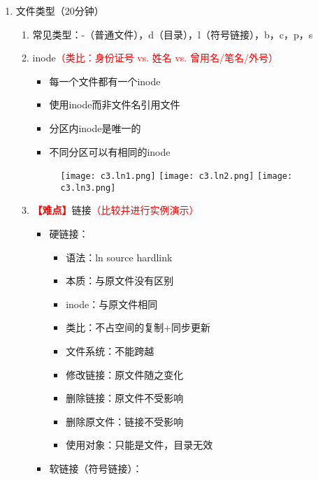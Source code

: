 \documentclass{TIJMUjiaoanLL}
\begin{document}
\begin{enumerate}
  \item 文件类型（20分钟）
    \begin{enumerate}
      \item 常见类型：-（普通文件），d（目录），l（符号链接），b，c，p，s
      \item inode\textcolor{red}{（类比：身份证号 vs. 姓名 vs. 曾用名/笔名/外号）}
        \vspace*{-10pt}
        \begin{multicols}{2}
          \begin{itemize}
	    \item 每一个文件都有一个inode
	    \item 使用inode而非文件名引用文件
	    \item 分区内inode是唯一的
	    \item 不同分区可以有相同的inode
	  \end{itemize}
        \end{multicols}
        \vspace*{-20pt}
        \begin{figure}[h]
	  \centering
	  \texttt{[image: c3.ln1.png]}
	  \texttt{[image: c3.ln2.png]}
	  \texttt{[image: c3.ln3.png]}
	\end{figure}
        \vspace*{-15pt}
      \item \textcolor{red}{\textbf{【难点】}}链接\textcolor{red}{（比较并进行实例演示）}
        \vspace*{-10pt}
        \begin{multicols}{2}
 	  \begin{itemize}
	    \item 硬链接：
	      \begin{itemize}
                \item 语法：ln source hardlink
		\item 本质：与原文件没有区别
		\item inode：与原文件相同
		\item 类比：不占空间的复制+同步更新
		\item 文件系统：不能跨越
		\item 修改链接：原文件随之变化
		\item 删除链接：原文件不受影响
		\item 删除原文件：链接不受影响
		\item 使用对象：只能是文件，目录无效
	      \end{itemize}
	    \item 软链接（符号链接）：

\end{itemize}
\end{multicols}
\end{enumerate}
\end{enumerate}
\end{document}
